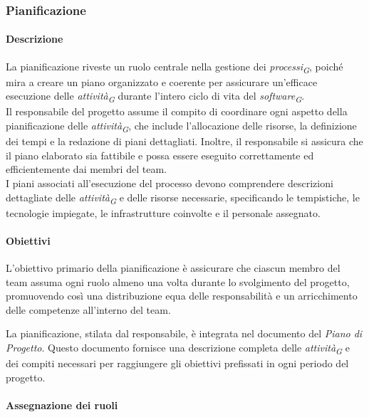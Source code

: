 \subsubsection{Pianificazione}

\paragraph{Descrizione}
La pianificazione riveste un ruolo centrale nella gestione dei \textit{processi}\textsubscript{\textit{G}}, poiché mira a creare un piano organizzato e coerente per assicurare un'efficace esecuzione delle \textit{attività}\textsubscript{\textit{G}} durante l'intero ciclo di vita del \textit{software}\textsubscript{\textit{G}}. \\
Il responsabile del progetto assume il compito di coordinare ogni aspetto della pianificazione delle \textit{attività}\textsubscript{\textit{G}}, che include l'allocazione delle risorse, la definizione dei tempi e la redazione di piani dettagliati. Inoltre, il responsabile si assicura che il piano elaborato sia fattibile e possa essere eseguito correttamente ed efficientemente dai membri del team. \\
I piani associati all'esecuzione del processo devono comprendere descrizioni dettagliate delle \textit{attività}\textsubscript{\textit{G}} e delle risorse necessarie, specificando le tempistiche, le tecnologie impiegate, le infrastrutture coinvolte e il personale assegnato.

\paragraph{Obiettivi}

L'obiettivo primario della pianificazione è assicurare che ciascun membro del team assuma ogni ruolo almeno una volta durante lo svolgimento del progetto, promuovendo così una distribuzione equa delle responsabilità e un arricchimento delle competenze all'interno del team.

\vspace{0,1cm}

La pianificazione, stilata dal responsabile, è integrata nel documento del \textit{Piano di Progetto}. Questo documento fornisce una descrizione completa delle \textit{attività}\textsubscript{\textit{G}} e dei compiti necessari per raggiungere gli obiettivi prefissati in ogni periodo del progetto.
\paragraph{Assegnazione dei ruoli}

